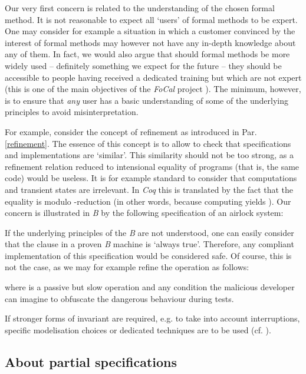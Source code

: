 \documentclass[conference]{IEEEtran}
\begin{document}
Our very first concern is related to the understanding of the chosen formal method. It is
not reasonable to expect all `users' of formal methods to be expert. One may consider for
example a situation in which a customer convinced by the interest of formal methods may
however not have any in-depth knowledge about any of them. In fact, we would also argue that
should formal methods be more widely used -- definitely something we expect for the future --
they should be accessible to people having received a dedicated training but which are not
expert (this is one of the main objectives of the \emph{FoCal} project
\cite{focal,TFTP04,TPHOL2003,calc03}). The minimum, however, is to ensure that \emph{any} user
has a basic understanding of some of the underlying principles to avoid misinterpretation.

For example, consider the concept of refinement as introduced in Par. \ref{refinement}. The
essence of this concept is to allow to check that specifications and implementations are
`similar'. This similarity should not be too strong, as a refinement relation reduced to
intensional equality of programs (that is, the same code) would be useless. It is for example
standard to consider that computations and transient states are irrelevant. In \emph{Coq} this
is translated by the fact that the equality is modulo {\small}-reduction (in other
words, {\small} because computing {\small} yields
{\small}). Our concern is illustrated in \emph{B} by the following specification of an
airlock system:

If the underlying principles of the \emph{B} are not understood, one can easily consider that
the {\small} clause in a proven \emph{B} machine is `always true'. Therefore,
any compliant implementation of this specification would be considered safe. Of course, this
is not the case, as we may for example refine the operation {\small} as follows:

where {\small} is a passive but slow operation and {\small} any
condition the malicious developer can imagine to obfuscate the dangerous behaviour during
tests.

If stronger forms of invariant are required, e.g. to take into account interruptions, specific
modelisation choices or dedicated techniques are to be used (cf.
\cite{DBLP:conf/fm/AndronickCP05}).

\subsection{About partial specifications}\label{partial_spec}
\end{document}
